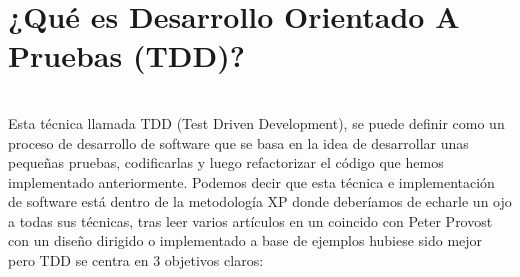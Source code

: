 \section{¿Qué es Desarrollo Orientado A Pruebas (TDD)?} 
\textbf{}\\
Esta técnica llamada TDD (Test Driven Development), se puede definir como un proceso de desarrollo de software que se basa en la idea de desarrollar unas pequeñas pruebas, codificarlas y luego refactorizar el código que hemos implementado anteriormente.
Podemos decir que esta técnica e implementación de software está dentro de la metodología XP donde deberíamos de echarle un ojo a todas sus técnicas, tras leer varios artículos en un coincido con Peter Provost con un diseño dirigido o implementado a base de ejemplos hubiese sido mejor pero TDD se centra en 3 objetivos claros:

